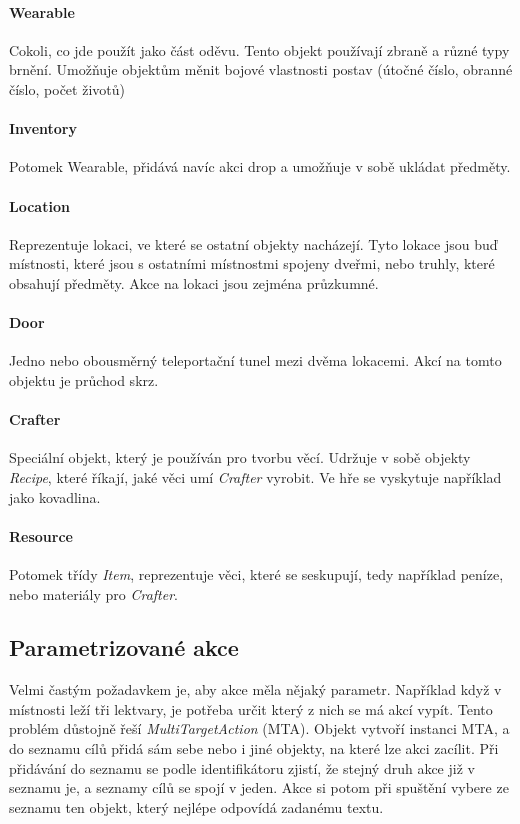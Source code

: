 \documentclass[11pt, a4paper]{article}
\def\class#1{\emph{#1}}
\begin{document}
\paragraph{Wearable} Cokoli, co jde použít jako část oděvu. Tento objekt používají zbraně a různé typy brnění. Umožňuje objektům měnit bojové vlastnosti postav (útočné číslo, obranné číslo, počet životů)

\paragraph{Inventory} Potomek Wearable, přidává navíc akci drop a umožňuje v sobě ukládat předměty.

\paragraph{Location} Reprezentuje lokaci, ve které se ostatní objekty nacházejí. Tyto lokace jsou buď místnosti, které jsou s ostatními místnostmi spojeny dveřmi, nebo truhly, které obsahují předměty. Akce na lokaci jsou zejména průzkumné. 

\paragraph{Door} Jedno nebo obousměrný teleportační tunel mezi dvěma lokacemi. Akcí na tomto objektu je průchod skrz.

\paragraph{Crafter} Speciální objekt, který je používán pro tvorbu věcí. Udržuje v sobě objekty \class{Recipe}, které říkají, jaké věci umí \class{Crafter} vyrobit. Ve hře se vyskytuje například jako kovadlina.

\paragraph{Resource} Potomek třídy \class{Item}, reprezentuje věci, které se seskupují, tedy například peníze, nebo materiály pro \class{Crafter}.

\subsection{Parametrizované akce}

Velmi častým požadavkem je, aby akce měla nějaký parametr. Například když v místnosti leží tři lektvary, je potřeba určit který z nich se má akcí vypít. Tento problém důstojně řeší \class{MultiTargetAction} (MTA). Objekt vytvoří instanci MTA, a do seznamu cílů přidá sám sebe nebo i jiné objekty, na které lze akci zacílit. Při přidávání do seznamu se podle identifikátoru zjistí, že stejný druh akce již v seznamu je, a seznamy cílů se spojí v jeden. Akce si potom při spuštění vybere ze seznamu ten objekt, který nejlépe odpovídá zadanému textu.
\end{document}
